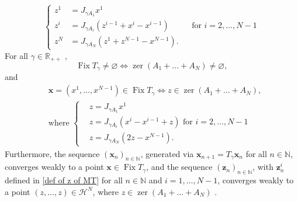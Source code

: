 \documentclass[a4paper,12pt]{article}
\DeclareMathOperator{\Fix}{Fix}
\DeclareMathOperator{\zer}{zer}
\begin{document}
    \begin{equation}\label{def of z of MT}
    \left\{\begin{aligned}
        z^1&=J_{\gamma A_1}x^1\\
        z^i&=J_{\gamma A_i}(z^{i-1}+x^i-x^{i-1})&&\text{for }i=2,\dots,N-1\\
        z^N&=J_{\gamma A_N}(z^1+z^{N-1}-x^{N-1}).
    \end{aligned}\right.
\end{equation} For all $\gamma \in \mathbb{R}_{++}$ \cite[Lemma 2]{malitsky2023resolvent}, \begin{equation}  \label{eq:MT-Fix-zer-1}
    \Fix T_\gamma \neq \varnothing \iff \zer(A_1 + \dots + A_N) \neq \varnothing,
\end{equation}and\begin{equation} \label{eq:MT-Fix-zer-2}
\begin{aligned}
    &\mathbf{x} = (x^1, \dots, x^{N-1}) \in \Fix T_\gamma \iff z \in \zer(A_1 + \dots + A_N),\\
    &\text{where~} \left\{\begin{aligned}
        &z = J_{\gamma A_1}x^1\\
        &z = J_{\gamma A_i}(x^i - x^{i-1} + z) \text{~for }i=2,\dots,N-1\\
        &z = J_{\gamma A_N}(2z - x^{N-1}).
    \end{aligned}\right.
\end{aligned}
\end{equation} Furthermore, the sequence $(\mathbf{x}_n)_{n \in \mathbb{N}}$, generated via $\mathbf{x}_{n+1} = T_\gamma \mathbf{x}_n$ for all $n \in \mathbb{N}$, converges weakly to a point $\mathbf{x} \in \Fix T_\gamma$, and the sequence $(\mathbf{z}_n)_{n \in \mathbb{N}}$, with $\mathbf{z}_n^i$ defined in \eqref{def of z of MT} for all $n \in \mathbb{N}$ and $i = 1, \dots, N-1$, converges weakly to a point $(z, \dots, z) \in \mathcal{H}^{N}$, where $z \in \zer(A_1 + \dots + A_N)$ \cite[Theorem 2]{malitsky2023resolvent}. 
\end{document}
